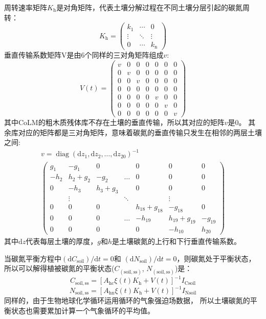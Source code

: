 周转速率矩阵$K_{\mathrm {h}} $是对角矩阵，代表土壤分解过程在不同土壤分层引起的碳氮周转：
\begin{equation}
  K_{\mathrm{h}}=\left(\begin{array}{ccc}k_{1} & \cdots & 0 \\ \vdots & \ddots & \vdots \\ 0 & \cdots & k_{\mathrm{n}}\end{array}\right)
\end{equation}
垂直传输系数矩阵V是由6个同样的三对角矩阵组成$v$:
\begin{equation}
  V(t)=\left(\begin{array}{ccccccc}v & 0 & 0 & 0 & 0 & 0 & 0 \\ 0 & v & 0 & 0 & 0 & 0 & 0 \\ 0 & 0 & v & 0 & 0 & 0 & 0 \\ 0 & 0 & 0 & 0 & 0 & 0 & 0 \\ 0 & 0 & 0 & 0 & v & 0 & 0 \\ 0 & 0 & 0 & 0 & 0 & v & 0 \\ 0 & 0 & 0 & 0 & 0 & 0 & v\end{array}\right)
\end{equation}
其中CoLM的粗木质残体库不存在土壤的垂直传输，所以其对应的矩阵$v$是0。
其余库对应的矩阵都是三对角矩阵，意味着碳氮的垂直传输只发生在相邻的两层土壤之间:
\begin{equation}
  \begin{array}{c}v=\operatorname{diag}\left({\mathrm {d}} z_{1},{\mathrm { d}} z_{2}, \ldots,{\mathrm {  d}} z_{20}\right)^{-1} \\
    \left(\begin{array}{ccccccc}g_{1} & -g_{1} & 0 & & 0 & 0 & 0 \\
        -h_{2} & h_{2}+g_{2} & -g_{2} & \ldots & 0 & 0 & 0 \\ 0 & -h_{3} & h_{3}+g_{3} & & 0 & 0 & 0 \\
        & \vdots & & \ddots & & \vdots & \\ 0 & 0 & 0 & & h_{18}+g_{18} & -g_{18} & 0 \\
  0 & 0 & 0 & \ldots & -h_{19} & h_{19}+g_{19} & -g_{19} \\ 0 & 0 & 0 & & 0 & -h_{10} & h_{20}\end{array}\right)\end{array}
\end{equation}
其中${\mathrm {d}} z$代表每层土壤的厚度，$g$和$h$是土壤碳氮的上行和下行垂直传输系数。

当碳氮平衡方程中$({\mathrm {d}} C_{\mathrm{soil}})/{\mathrm {d}} t=0$和 $({\mathrm {d}} N_{\mathrm{soil}})/{\mathrm {d}} t=0$，则碳氮处于平衡状态，
所以可以解得植被碳氮的平衡状态($C_{\mathrm{(soil,ss)}}$, $N_{\mathrm{(soil,ss)}}$)是：
%
\begin{equation}
  C_{\mathrm{soil, s s}}=\left[A_{\mathrm{h c}} \xi(t) K_{\mathrm{h}}+V(t)\right]^{-1} I_{\mathrm{C s o i l}}
\end{equation}
\begin{equation}
  N_{\mathrm{soil, s s}}=\left[A_{\mathrm{h n}} \xi(t) K_{\mathrm{h}}+V(t)\right]^{-1} I_{\mathrm{N s o i l}}
\end{equation}
同样的，由于生物地球化学循环运用循环的气象强迫场数据，
所以土壤碳氮的平衡状态也需要累加计算一个气象循环的平均值。 
